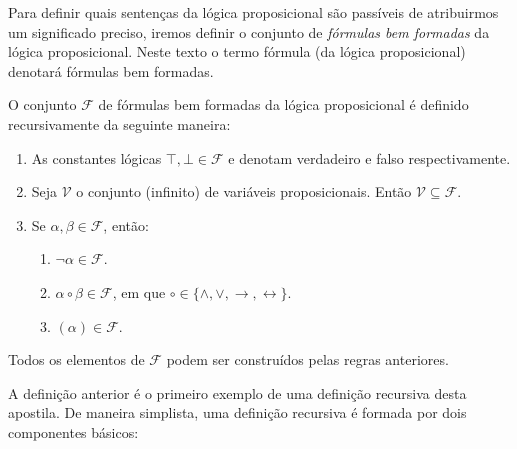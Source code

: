 Para definir quais senten\c{c}as da l\'ogica proposicional s\~ao pass\'iveis de atribuirmos um significado preciso, iremos definir o conjunto
de \textit{f\'ormulas bem formadas} da l\'ogica proposicional. Neste texto o termo f\'ormula (da l\'ogica proposicional) denotar\'a f\'ormulas
bem formadas.

\begin{Definition}
O conjunto $\mathcal{F}$ de f\'ormulas bem formadas da l\'ogica proposicional \'e definido recursivamente da seguinte maneira:
\begin{enumerate}
  \item As constantes l\'ogicas $\top,\bot \in \mathcal{F}$ e denotam verdadeiro e falso respectivamente. 
  \item Seja $\mathcal{V}$ o conjunto (infinito) de vari\'aveis proposicionais. Ent\~ao $\mathcal{V} \subseteq \mathcal{F}$.
  \item Se $\alpha,\beta \in \mathcal{F}$, ent\~ao:
  \begin{enumerate}
    \item $\neg \alpha \in \mathcal{F}$.
    \item $\alpha \circ \beta \in \mathcal{F}$, em que $\circ \in \{\land,\lor,\to,\leftrightarrow\}$.
    \item $(\alpha)\in\mathcal{F}$.
  \end{enumerate}
\end{enumerate}
Todos os elementos de $\mathcal{F}$ podem ser constru\'idos pelas regras anteriores.
\end{Definition}
A defini\c{c}\~ao anterior \'e o primeiro exemplo de uma defini\c{c}\~ao recursiva desta apostila. De maneira simplista, uma defini\c{c}\~ao
recursiva \'e formada por dois componentes b\'asicos:
